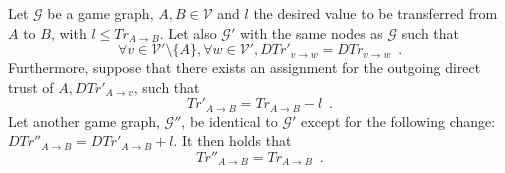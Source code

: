 {}
\begin{theorem}
\label{riskinv}
  Let $\mathcal{G}$ be a game graph, $A, B \in \mathcal{V}$ and $l$ the desired value to be transferred from $A$ to $B$, with
  $l \leq Tr_{A \rightarrow B}$. Let also $\mathcal{G}'$ with the same nodes as $\mathcal{G}$ such that
  \begin{equation*}
    \forall v \in \mathcal{V}' \setminus \{A\}, \forall w \in \mathcal{V}', DTr'_{v \rightarrow w} =
    DTr_{v \rightarrow w} \enspace.
  \end{equation*}
  Furthermore, suppose that there exists an assignment for the outgoing direct trust of $A, DTr'_{A \rightarrow v}$, such
  that
  \begin{equation}
  \label{primetrust}
    Tr'_{A \rightarrow B} = Tr_{A \rightarrow B} - l \enspace.
  \end{equation}
  Let another game graph, $\mathcal{G}''$, be identical to $\mathcal{G}'$ except for the following change:
  $DTr''_{A \rightarrow B} = DTr'_{A \rightarrow B} + l$.
  It then holds that
  \begin{equation*}
    Tr''_{A \rightarrow B} = Tr_{A \rightarrow B} \enspace.
  \end{equation*}
\end{theorem}
